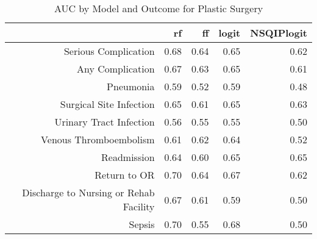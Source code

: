 \begin{table}[ht]
\centering
\begin{tabular}{rrrrr}
  \hline
 & rf & ff & logit & NSQIPlogit \\ 
  \hline
Serious Complication & 0.68 & 0.64 & 0.65 & 0.62 \\ 
  Any Complication & 0.67 & 0.63 & 0.65 & 0.61 \\ 
  Pneumonia & 0.59 & 0.52 & 0.59 & 0.48 \\ 
  Surgical Site Infection & 0.65 & 0.61 & 0.65 & 0.63 \\ 
  Urinary Tract Infection & 0.56 & 0.55 & 0.55 & 0.50 \\ 
  Venous Thromboembolism & 0.61 & 0.62 & 0.64 & 0.52 \\ 
  Readmission & 0.64 & 0.60 & 0.65 & 0.65 \\ 
  Return to OR & 0.70 & 0.64 & 0.67 & 0.62 \\ 
  Discharge to Nursing or Rehab Facility & 0.67 & 0.61 & 0.59 & 0.50 \\ 
  Sepsis & 0.70 & 0.55 & 0.68 & 0.50 \\ 
   \hline
\end{tabular}
\caption{AUC by Model and Outcome for Plastic Surgery} 
\end{table}
